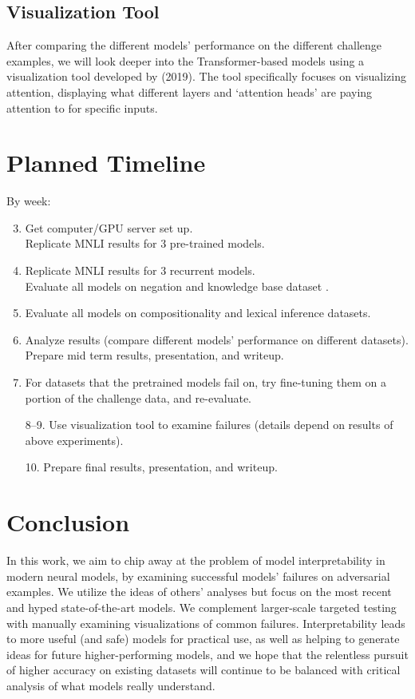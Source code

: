 \documentclass[letterpaper]{article}
\begin{document}
\subsection{Visualization Tool}
After comparing the different models' performance on the different challenge examples, we will look deeper into the Transformer-based models using a visualization tool developed by \citeauthor{vig_visualizing_2019} (2019).
The tool specifically focuses on visualizing attention, displaying what different layers and `attention heads' are paying attention to for specific inputs.



\section{Planned Timeline}
By week:
\begin{enumerate}
	\setcounter{enumi}{2}
	\item Get computer/GPU server set up. \\
		 Replicate MNLI results for 3 pre-trained models.
	\item Replicate MNLI results for 3 recurrent models. \\
	Evaluate all models on negation and knowledge base dataset \cite{kang_adventure:_2018}.
	\item Evaluate all models on compositionality \cite{nie_analyzing_2018} and lexical inference \cite{glockner_breaking_2018} datasets.
	\item Analyze results (compare different models' performance on different datasets). \\ 
	Prepare mid term results, presentation, and writeup.
	\item For datasets that the pretrained models fail on, try fine-tuning them on a portion of the challenge data, and re-evaluate.
	\item[8--9.] Use visualization tool to examine failures (details depend on results of above experiments).
	\item[10.] Prepare final results, presentation, and writeup.
\end{enumerate}



\section{Conclusion}
In this work, we aim to chip away at the problem of model interpretability in modern neural models, by examining successful models' failures on adversarial examples.
We utilize the ideas of others' analyses but focus on the most recent and hyped state-of-the-art models.
We complement larger-scale targeted testing with manually examining visualizations of common failures.
Interpretability leads to more useful (and safe) models for practical use, as well as helping to generate ideas for future higher-performing models, and we hope that the relentless pursuit of higher accuracy on existing datasets will continue to be balanced with critical analysis of what models really understand.




\end{document}
